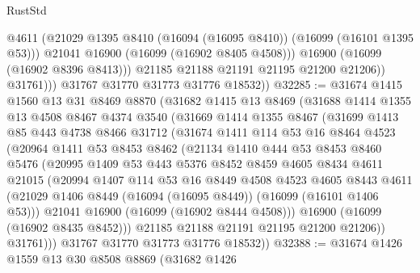 \begin{lexlean}{RustStd}
\begin{coremodule}
                      @4611
                      (@21029 @1395 @8410 (@16094 (@16095 @8410)) (@16099 (@16101 @1395 @53)))
                      @21041
                      @16900
                      (@16099 (@16902 @8405 @4508)))
                    @16900
                    (@16099 (@16902 @8396 @8413)))
                  @21185
                  @21188
                  @21191
                  @21195
                  @21200
                  @21206))
              @31761)))
        @31767
        @31770
        @31773
        @31776
        @18532))
@32285 := @31674
    @1415
    @1560
    @13
    @31
    @8469
    @8870
    (@31682
      @1415
      @13
      @8469
      (@31688
        @1414
        @1355
        @13
        @4508
        @8467
        @4374
        @3540
        (@31669
          @1414
          @1355
          @8467
          (@31699
            @1413
            @85
            @443
            @4738
            @8466
            @31712
            (@31674
              @1411
              @114
              @53
              @16
              @8464
              @4523
              (@20964
                @1411
                @53
                @8453
                @8462
                (@21134
                  @1410
                  @444
                  @53
                  @8453
                  @8460
                  @5476
                  (@20995
                    @1409
                    @53
                    @443
                    @5376
                    @8452
                    @8459
                    @4605
                    @8434
                    @4611
                    @21015
                    (@20994
                      @1407
                      @114
                      @53
                      @16
                      @8449
                      @4508
                      @4523
                      @4605
                      @8443
                      @4611
                      (@21029 @1406 @8449 (@16094 (@16095 @8449)) (@16099 (@16101 @1406 @53)))
                      @21041
                      @16900
                      (@16099 (@16902 @8444 @4508)))
                    @16900
                    (@16099 (@16902 @8435 @8452)))
                  @21185
                  @21188
                  @21191
                  @21195
                  @21200
                  @21206))
              @31761)))
        @31767
        @31770
        @31773
        @31776
        @18532))
@32388 := @31674
    @1426
    @1559
    @13
    @30
    @8508
    @8869
    (@31682
      @1426

\end{coremodule}
\end{lexlean}
